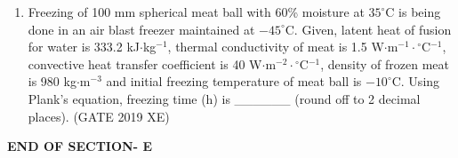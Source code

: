\documentclass[journal,12pt,onecolumn]{IEEEtran}
\begin{document}
\begin{enumerate}
\item Freezing of 100 mm spherical meat ball with 60\% moisture at $35^\circ$C is being done in an air blast freezer maintained at $-45^\circ$C. Given, latent heat of fusion for water is 333.2 kJ$\cdot$kg$^{-1}$, thermal conductivity of meat is 1.5 W$\cdot$m$^{-1}\cdot{}^\circ$C$^{-1}$, convective heat transfer coefficient is 40 W$\cdot$m$^{-2}\cdot{}^\circ$C$^{-1}$, density of frozen meat is 980 kg$\cdot$m$^{-3}$ and initial freezing temperature of meat ball is $-10^\circ$C. Using Plank's equation, freezing time (h) is \_\_\_\_\_\_ (round off to 2 decimal places).
\hfill{(GATE 2019 XE)} \\

\end{enumerate}

\vspace{3\baselineskip}
\begin{center}
    \item[\textbf{END OF SECTION- E}]
\end{center}
\end{document}
